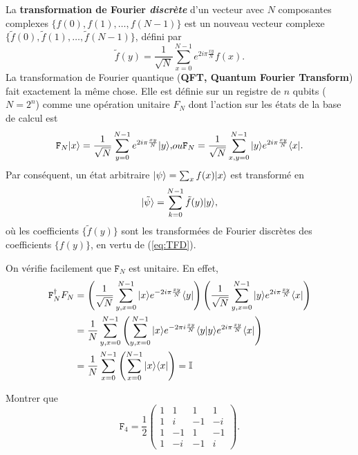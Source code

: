 La \textbf{transformation de Fourier \emph{discrète}} d'un vecteur avec $N$
composantes complexes $\{{f(0),f(1),\ldots,f(N-1)\}}$ est un nouveau vecteur
complexe $\{{\tilde{f}(0),\tilde{f}(1),\ldots,\tilde{f}(N-1)\}}$, défini par%
\begin{equation}
{\tilde{f}(y)=}\frac{1}{\sqrt{N}}\sum_{x=0}^{N-1}e^{2i\pi\frac{xy}{N}}f(x).
\label{eq:TFD}%
\end{equation}
La transformation de Fourier quantique (\textbf{QFT, Quantum Fourier Transform})
fait exactement la même chose. Elle est définie sur un registre de $n$ qubits
($N=2^n$) comme une opération unitaire $F_N$ dont l'action sur les états de la
base de calcul est%
\begin{subequations}%
\label{eq:QTFD}%
\begin{align}
\mathtt{F}_{N}\ket{x}=\frac{1}{\sqrt{N}}\sum_{y=0}^{N-1}e^{2i\pi\frac{xy}{N}}
\ket{y},
\end{align}%
ou
\begin{align}
\mathtt{F}_{N}=\frac{1}{\sqrt{N}}\sum_{x,y=0}^{N-1}\ket{y}e^{2i\pi\frac{xy}{N}}
\bra{x}.
\end{align}%
\end{subequations}%
Par conséquent, un état arbitraire $\vert\psi\rangle=\sum_{x}f(x)\vert x\rangle$ est
transformé en
\begin{equation}
\vert\tilde{\psi}\rangle=\sum_{k=0}^{N-1}{\tilde{f}(y)}\vert y\rangle,
\end{equation}
où les coefficients $\{{\tilde{f}(y)}\}$ sont les transformées de Fourier
discrètes des coefficients $\{f(y)\}$, en vertu de (\ref{eq:TFD}).

On vérifie facilement que $\mathtt{F}_N$ est unitaire. En effet,%
\begin{subequations}%
\begin{align}
\mathtt{F}_N^{\dagger}F_{N}  &  =\left(  \frac{1}{\sqrt{N}}\sum_{y,x=0}%
^{N-1}\ket{x}e^{-2i\pi\frac{xy}{N}}\bra{y}\right)  \left(
\frac{1}{\sqrt{N}}\sum_{y,x=0}^{N-1}\ket{y} e^{2i\pi\frac{xy}{N}}\bra{x}
\right) \\
&  =\frac{1}{N}\sum_{y,x=0}^{N-1}\left(  \sum_{y,x=0}^{N-1}\ket{x} e^{-2\pi
i\frac{xy}{N}}\langle y\ket{y}e^{2i\pi\frac{xy}{N}}\bra{x} \right) \\
&  =\frac{1}{N}\sum_{x=0}^{N-1}\left(  \sum_{x=0}^{N-1}\ket{x}\bra{x}
\right)
=\mathbb{I}%
\end{align}%
\end{subequations}%

\begin{exercise}
Montrer que
\begin{equation}
\mathtt{F}_4=\frac{1}{2}\begin{pmatrix}
1 & 1 & 1 & 1\\
1 & i & -1 & -i\\
1 & -1 & 1 & -1\\
1 & -i & -1 & i
\end{pmatrix}.
\label{eq:F4}
\end{equation}
\end{exercise}

